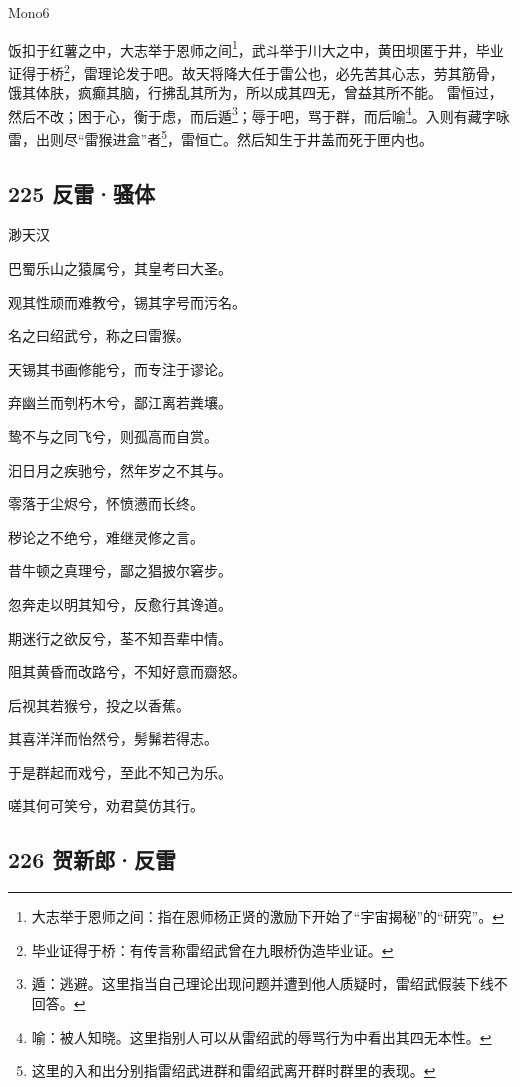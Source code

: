 {Mono6}

饭扣于红薯之中，大志举于恩师之间\footnote{大志举于恩师之间：指在恩师杨正贤的激励下开始了``宇宙揭秘''的``研究''。}，武斗举于川大之中，黄田坝匿于井，毕业证得于桥\footnote{毕业证得于桥：有传言称雷绍武曾在九眼桥伪造毕业证。}，雷理论发于吧。故天将降大任于雷公也，必先苦其心志，劳其筋骨，饿其体肤，疯癫其脑，行拂乱其所为，所以成其四无，曾益其所不能。
雷恒过，然后不改；困于心，衡于虑，而后遁\footnote{遁：逃避。这里指当自己理论出现问题并遭到他人质疑时，雷绍武假装下线不回答。}；辱于吧，骂于群，而后喻\footnote{喻：被人知晓。这里指别人可以从雷绍武的辱骂行为中看出其四无本性。}。入则有藏字咏雷，出则尽``雷猴进盒''者\footnote{这里的入和出分别指雷绍武进群和雷绍武离开群时群里的表现。}，雷恒亡。然后知生于井盖而死于匣内也。

\hypertarget{ux53cdux96f7ux9a9aux4f53}{%
\subsection{225 反雷·骚体}\label{ux53cdux96f7ux9a9aux4f53}}

{渺天汉}

巴蜀乐山之猿属兮，其皇考曰大圣。

观其性顽而难教兮，锡其字号而污名。

名之曰绍武兮，称之曰雷猴。

天锡其书画修能兮，而专注于谬论。

弃幽兰而刳朽木兮，鄙江离若粪壤。

鸷不与之同飞兮，则孤高而自赏。

汩日月之疾驰兮，然年岁之不其与。

零落于尘烬兮，怀愤懑而长终。

秽论之不绝兮，难继灵修之言。

昔牛顿之真理兮，鄙之猖披尔窘步。

忽奔走以明其知兮，反愈行其谗道。

期迷行之欲反兮，荃不知吾辈中情。

阻其黄昏而改路兮，不知好意而齌怒。

后视其若猴兮，投之以香蕉。

其喜洋洋而怡然兮，髣髴若得志。

于是群起而戏兮，至此不知己为乐。

嗟其何可笑兮，劝君莫仿其行。

\hypertarget{ux8d3aux65b0ux90ceux53cdux96f7}{%
\subsection{226 贺新郎·反雷}\label{ux8d3aux65b0ux90ceux53cdux96f7}}

